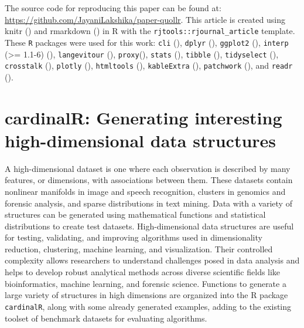 \documentclass[
  11pt,
  a4paper,
]{report}
\newcommand{\CRANpkg}[1]{\textsf{#1}}
\begin{document}
The source code for reproducing this paper can be found at:
\url{https://github.com/JayaniLakshika/paper-quollr}. This article is
created using \CRANpkg{knitr}
() and \CRANpkg{rmarkdown}
() in R with the
\texttt{rjtools::rjournal\_article} template. These \texttt{R} packages
were used for this work: \texttt{cli}
(), \texttt{dplyr}
(), \texttt{ggplot2}
(), \texttt{interp}
(\textgreater= 1.1-6)
(),
\texttt{langevitour} (),
\texttt{proxy}(),
\texttt{stats} (),
\texttt{tibble} (),
\texttt{tidyselect} (),
\texttt{crosstalk} (),
\texttt{plotly} (),
\texttt{htmltools} (),
\texttt{kableExtra} (),
\texttt{patchwork} (), and
\texttt{readr} ().


\chapter{cardinalR: Generating interesting high-dimensional data
structures}\label{sec-fourth-paper}

A high-dimensional dataset is one where each observation is described by
many features, or dimensions, with associations between them. These
datasets contain nonlinear manifolds in image and speech recognition,
clusters in genomics and forensic analysis, and sparse distributions in
text mining. Data with a variety of structures can be generated using
mathematical functions and statistical distributions to create test
datasets. High-dimensional data structures are useful for testing,
validating, and improving algorithms used in dimensionality reduction,
clustering, machine learning, and visualization. Their controlled
complexity allows researchers to understand challenges posed in data
analysis and helps to develop robust analytical methods across diverse
scientific fields like bioinformatics, machine learning, and forensic
science. Functions to generate a large variety of structures in high
dimensions are organized into the R package \texttt{cardinalR}, along
with some already generated examples, adding to the existing toolset of
benchmark datasets for evaluating algorithms.
\end{document}
